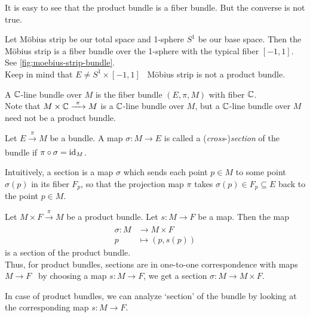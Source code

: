 It is easy to see that the product bundle is a fiber bundle. But the converse is not true.
\begin{example}
	Let M\"obius strip be our total space and 1-sphere \(S^1\) be our base space. Then the M\"obius strip is a fiber bundle over the 1-sphere with the typical fiber \([-1, 1]\). See \cref{fig:moebius-strip-bundle}.\\
	Keep in mind that \(E \ne S^1 \times [-1, 1]\) \ie\ M\"obius strip is not a product bundle.
\end{example}

\begin{example}
	A \(\mathbb C\)-line bundle over \(M\) is the fiber bundle \((E,\pi,M)\) with fiber \(\mathbb C\). \\
	Note that \(M \times \mathbb C \xrightarrow[]{\ \pi\ } M\) is a \(\mathbb C\)-line bundle over \(M\), but a \(\mathbb C\)-line bundle over \(M\) need not be a product bundle.
\end{example}

\begin{definition}[Section]
	Let \(E \xrightarrow[]{\ \pi\ } M\) be a bundle. A map \(\sigma: M \to E\) is called a (\emph{cross}-)\emph{section} of the bundle if \(\pi \circ \sigma = \operatorname{id}_M\).
\end{definition}

Intuitively, a section is a map \(\sigma\) which sends each point \(p \in M\) to some point \(\sigma(p)\) in its fiber \(F_p\), so that the projection map \(\pi\) takes \(\sigma(p) \in F_p \subseteq E\) back to the point \(p \in M\).

\begin{example}
	Let \(M \times F \xrightarrow[]{\ \pi\ } M\) be a product bundle. Let \(s: M \to F\) be a map. Then the map
	\begin{equation}
		\begin{aligned}
			\sigma: M & \to M \times F    \\
			p         & \mapsto (p, s(p))
		\end{aligned}
	\end{equation}
	is a section of the product bundle. \\
	Thus, for product bundles, sections are in one-to-one correspondence with maps \(M \to F\) \ie\ by choosing a map \(s: M \to F\), we get a section \(\sigma: M \to M \times F\).
\end{example}
In case of product bundles, we can analyze `section' of the bundle by looking at the corresponding map \(s: M \to F\).

